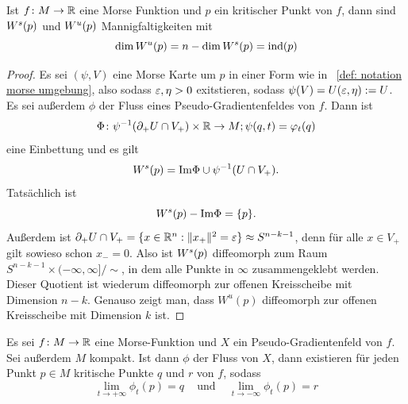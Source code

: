 \begin{prop}
    Ist $f \colon M \to { \mathbb R }$ eine Morse Funktion und $p$ ein kritischer Punkt von $f$, dann sind
    ${ W^s } (p)$ und ${ W^u } (p)$ Mannigfaltigkeiten mit 
    \[ \dim { W^u } (p) = n - \dim { W^s } (p) = { \operatorname{ind} } (p) \]
\end{prop}

\begin{proof}
    Es sei $(\psi, V)$ eine Morse Karte um $p$ in einer Form wie in ~\ref{def: notation morse umgebung},
    also sodass $\varepsilon, \eta > 0$ exitstieren, sodass $\psi(V) = U(\varepsilon, \eta) := U$. Es sei außerdem
    $\phi$ der Fluss eines Pseudo-Gradientenfeldes von $f$. Dann ist 
    \[ \Phi \colon \psi^{-1}({ \partial }_+ U \cap V_+) \times { \mathbb R } \to M ; \psi(q, t) = \varphi_t(q) \]
    eine Einbettung und es gilt 
    \[ { W^s } (p) = { \operatorname{Im} } \Phi \cup \psi^{-1}(U \cap V_+) . \]
    Tatsächlich ist 
    \[ { W^s } (p) - { \operatorname{Im} } \Phi = \{ p \} . \]
    Außerdem ist ${ \partial }_+ U \cap V_+ = \{ x \in { \mathbb R }^n: \| x_+ \|^2 = \varepsilon \} \approx S^{n - k - 1}$, 
    denn für alle $x \in V_+$ gilt sowieso schon $x_- = 0$. Also ist $ { W^s }(p)$ diffeomorph zum Raum 
    $S^{n - k - 1} \times (-\infty, \infty]/\sim$, in dem alle Punkte in $\infty$ zusammengeklebt 
    werden. Dieser Quotient ist wiederum diffeomorph zur offenen Kreisscheibe mit Dimension $n - k$.
    Genauso zeigt man, dass $W^u (p)$ diffeomorph zur offenen Kreisscheibe mit Dimension $k$ ist.
\end{proof}

\begin{prop}
    \label{prop: trajektorien enden in kritischen punkten}
    Es sei $f \colon M \to { \mathbb R }$ eine Morse-Funktion und $X$ ein Pseudo-Gradientenfeld von $f$. 
    Sei außerdem $M$ kompakt. Ist dann $\phi$ der Fluss von $X$, dann existieren für jeden Punkt 
    $p \in M$ kritische Punkte $q$ und $r$ von $f$, sodass
    \[ \lim_{t \to + \infty} \phi_t(p) = q \;\;\; 
    \text{ und } \;\;\; \lim_{t \to -\infty} \phi_t(p) = r \]
\end{prop}

